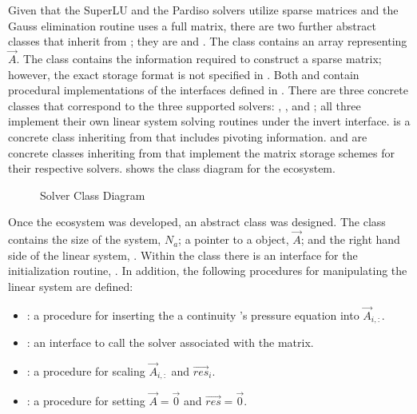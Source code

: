 Given that the SuperLU and the Pardiso solvers utilize sparse matrices and the Gauss elimination routine uses a full matrix, there are two further abstract classes that inherit from ; they are  and .
The  class contains an array representing $\vec{A}$.
The  class contains the information required to construct a sparse matrix; however, the exact storage format is not specified in .
Both  and  contain procedural implementations of the interfaces defined in .
There are three concrete classes that correspond to the three supported solvers: , , and ; all three implement their own linear system solving routines under the invert interface.
 is a concrete class inheriting from  that includes pivoting information.
 and  are concrete classes inheriting from  that implement the matrix storage schemes for their respective solvers.
 shows the class diagram for the  ecosystem.

\begin{figure}[ht!]
\singlespace\centering

\caption{Solver Class Diagram}
\label{fig:solverClassDiagram}
\end{figure}

Once the  ecosystem was developed, an abstract  class was designed.
The  class contains the size of the system, $N_{a}$; a pointer to a  object, $\vec{A}$; and the right hand side of the linear system, .
Within the  class there is an interface for the initialization routine, .
In addition, the following procedures for manipulating the linear system are defined:

\begin{itemize}
\item{  : a procedure for inserting the a continuity 's pressure equation into $\vec{A}_{i, :}$.}
\item{  : an interface to call the solver associated with the matrix.}
\item{  : a procedure for scaling $\vec{A}_{i, :}$ and $\vec{res}_{i}$.}
\item{  : a procedure for setting $\vec{A} = \vec{0}$ and $\vec{res} = \vec{0}$.}
\end{itemize}

